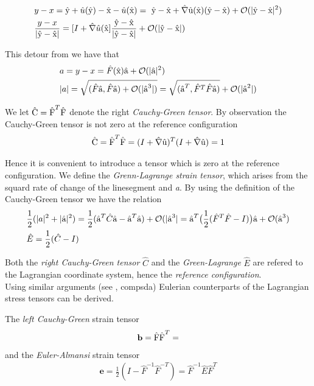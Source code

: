 \begin{appendices}
\begin{align*}
&y - x = \text{\^{y}} + \hat{u}(\text{\^{y}}) - \text{\^{x}} - \hat{u}(\text{\^{x}}) = \
\text{\^{y}} - \text{\^{x}} + \hat{\nabla}\text{\^{u}}(\text{\^{x}}) (\text{\^{y}} - \text{\^{x}}) 
+ \mathcal{O}(|\text{\^{y}} - \text{\^{x}} |^2) \\
&\frac{y - x}{|\text{\^{y}} - \text{\^{x}}|} = [I + \hat{\nabla}\hat{u}(\text{\^{x}} ]  
\frac{\text{\^{y}} - \text{\^{x}}}{|\text{\^{y}} - \text{\^{x}}|} + \mathcal{O}(|\text{\^{y}} - \text{\^{x}} |) 
\end{align*}

This detour from \cite{Richter2016}  we have that 
\begin{align*}
&a = y - x = \hat{F}(\text{\^{x}})\text{\^{a}} +  \mathcal{O}(|\text{\^{a}} |^2) \\
&|a| = \sqrt{ (\hat{F}\text{\^{a}},\hat{F}\text{\^{a}})+ \mathcal{O} (|\text{\^{a}}^3|)  } = 
 \sqrt{ (\text{\^{a}}^T, \hat{F}^T\hat{F}\text{\^{a}})} + \mathcal{O} (|\text{\^{a}}^2|)  
\end{align*}

We let $\text{\^{C}} = \text{\^{F}}^T \text{\^{F}}$ denote the right \textit{Cauchy-Green tensor}.
By observation the Cauchy-Green tensor is not zero at the reference configuration 
\begin{align*}
\text{\^{C}} =  \text{\^{F}}^T \text{\^{F}} = (I + \hat{\nabla} \text{\^{u}})^T (I + \hat{\nabla} \text{\^{u}}) = 1
\end{align*}

Hence it is convenient to introduce a tensor which is zero at the reference configuration. We define the \textit{Grenn-Lagrange strain tensor}, which arises from the squard rate of change of the linesegment  and \textit{a}. By using the definition of the Cauchy-Green tensor we have the relation
\begin{align*}
&\frac{1}{2}(|a|^2 + |\text{\^{a}}|^2) = \frac{1}{2}(\text{\^{a}}^T\hat{C}\text{\^{a}}
 -\text{\^{a}}^T \text{\^{a}} ) + \mathcal{O}(|\text{\^{a}}^3| = 
 \text{\^{a}}^T \big(\frac{1}{2} (\hat{F}^T \hat{F} - I) \big) \text{\^{a}} 
 + \mathcal{O}(\text{\^{a}}^3) \\
&\hat{E} = \frac{1}{2}(\hat{C} - I)
\end{align*}

Both the \textit{right Cauchy-Green tensor} $\hat{C}$ and the \textit{Green-Lagrange} $\hat{E}$ are refered to the Lagrangian coordinate system, hence the \textit{reference configuration}. \\
Using similar arguments (see \cite{Richter2016}, compsda) Eulerian counterparts of the Lagrangian stress tensors can be derived.

The \textit{left Cauchy-Green} strain tensor 
\begin{align*}
\mathbf{b} = \text{\^{F}} \text{\^{F}}^T = 
\end{align*}
and the \textit{Euler-Almansi} strain tensor
\begin{align*}
\mathbf{e} = \frac{1}{2} (I - \hat{F}^{-1}\hat{F}^{-T}) = \hat{F}^{-1}\hat{E}\hat{F}^{T}
\end{align*}

\end{appendices}